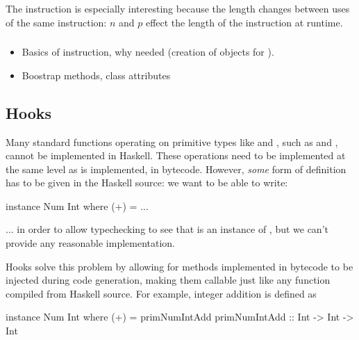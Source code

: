 \documentclass[dissertation.tex]{subfiles}
\begin{document}
{{{            The  instruction is especially interesting because the length changes between
            uses of the same instruction: \(n\) and \(p\) effect the length of the instruction at runtime.
        
        }
        \subsubsection{}
        {

            \begin{itemize}
            \item
            {
                Basics of instruction, why needed (creation of  objects for
                ).
            }
            \item Boostrap methods, class attributes
            \end{itemize}
        }
    }
    \subsection{Hooks}
    {

        Many standard functions operating on primitive types like  and , such as
        \haskell{(+)} and \haskell{(==)}, cannot be implemented in Haskell. These operations need to be implemented
        at the same level as  is implemented, in bytecode. However, \textit{some} form of definition
        has to be given in the Haskell source: we want to be able to write:

        \begin{haskellfigure}
        instance Num Int where
            (+) = ...
        \end{haskellfigure}

        ... in order to allow typechecking to see that  is an instance of , but we can't
        provide any reasonable implementation.

        Hooks solve this problem by allowing for methods implemented in bytecode to be injected during code
        generation, making them callable just like any function compiled from Haskell source. For example, integer
        addition is defined as 

        \begin{haskellfigure}
        instance Num Int where
            (+) = primNumIntAdd
        primNumIntAdd :: Int -> Int -> Int
        \end{haskellfigure}

}}
\end{document}
